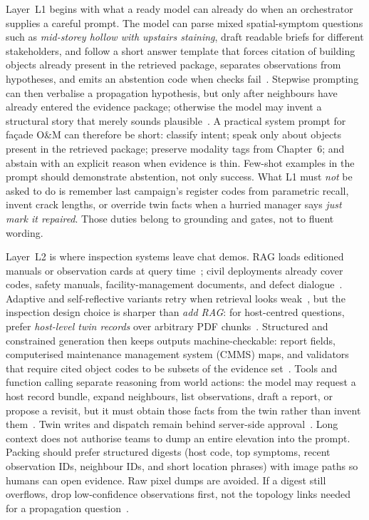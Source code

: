 Layer~L1 begins with what a ready model can already do when an orchestrator supplies a careful prompt. The model can parse mixed spatial-symptom questions such as \emph{mid-storey hollow with upstairs staining}, draft readable briefs for different stakeholders, and follow a short answer template that forces citation of building objects already present in the retrieved package, separates observations from hypotheses, and emits an abstention code when checks fail~\cite{ouyang2022instructgpt,ji2023}. Stepwise prompting can then verbalise a propagation hypothesis, but only after neighbours have already entered the evidence package; otherwise the model may invent a structural story that merely sounds plausible~\cite{wei2022cot,ji2023}. A practical system prompt for fa\c{c}ade O\&M can therefore be short: classify intent; speak only about objects present in the retrieved package; preserve modality tags from Chapter~6; and abstain with an explicit reason when evidence is thin. Few-shot examples in the prompt should demonstrate abstention, not only success. What L1 must \emph{not} be asked to do is remember last campaign's register codes from parametric recall, invent crack lengths, or override twin facts when a hurried manager says \emph{just mark it repaired}. Those duties belong to grounding and gates, not to fluent wording.

Layer~L2 is where inspection systems leave chat demos. RAG loads editioned manuals or observation cards at query time~\cite{lewis2020,shuster2021}; civil deployments already cover codes, safety manuals, facility-management documents, and defect dialogue~\cite{joffe2025buildingcodes,lee2024ragsafety,krutli2025fmrags,jeon2025hybridrag,he2025regulationhybrid}. Adaptive and self-reflective variants retry when retrieval looks weak~\cite{gao2023hyde,asai2024selfrag,jeong2024adaptive}, but the inspection design choice is sharper than \emph{add RAG}: for host-centred questions, prefer \emph{host-level twin records} over arbitrary PDF chunks~\cite{peng2024}. Structured and constrained generation then keeps outputs machine-checkable: report fields, computerised maintenance management system (CMMS) maps, and validators that require cited object codes to be subsets of the evidence set~\cite{pan2024b,chen2024bimllmontology,iversen2026,buga2025llmfmsql}. Tools and function calling separate reasoning from world actions: the model may request a host record bundle, expand neighbours, list observations, draft a report, or propose a revisit, but it must obtain those facts from the twin rather than invent them~\cite{schick2023toolformer,yao2023react,guo2025bimllmquery,liu2025bimcoder,li2025b,li2025c}. Twin writes and dispatch remain behind server-side approval~\cite{luo2025llmdtrobot,gao2026ifcagent}. Long context does not authorise teams to dump an entire elevation into the prompt. Packing should prefer structured digests (host code, top symptoms, recent observation IDs, neighbour IDs, and short location phrases) with image paths so humans can open evidence. Raw pixel dumps are avoided. If a digest still overflows, drop low-confidence observations first, not the topology links needed for a propagation question~\cite{lewis2020,asai2024selfrag}.

